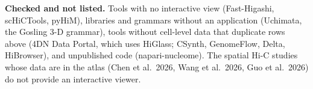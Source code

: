 \medskip\noindent\textbf{Checked and not listed.}
Tools with no interactive view (Fast-Higashi, scHiCTools, pyHiM), libraries and grammars without an application (Uchimata, the Gosling 3-D grammar), tools without cell-level data that duplicate rows above (4DN Data Portal, which uses HiGlass; CSynth, GenomeFlow, Delta, HiBrowser), and unpublished code (napari-nucleome).
The spatial Hi-C studies whose data are in the atlas (Chen et al.\ 2026, Wang et al.\ 2026, Guo et al.\ 2026) do not provide an interactive viewer.
